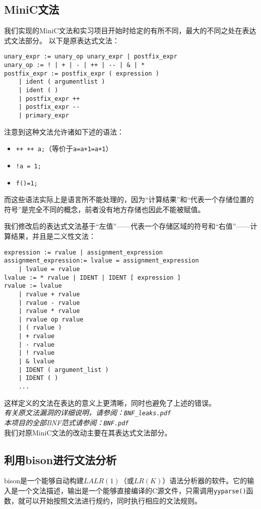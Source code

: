 \subsection{MiniC文法}
我们实现的MiniC文法和实习项目开始时给定的有所不同，最大的不同之处在表达式文法部分。
以下是原表达式文法：
\begin{verbatim}
unary_expr := unary_op unary_expr | postfix_expr
unary_op := ! | + | - | ++ | -- | & | *
postfix_expr := postfix_expr ( expression )
	| ident ( argumentlist )
	| ident ( )
	| postfix_expr ++
	| postfix_expr --
	| primary_expr
\end{verbatim}
注意到这种文法允许诸如下述的语法：
\begin{itemize}
	\item \verb|++ ++ a;|（等价于\verb|a=a+1=a+1|）
	\item \verb|!a = 1;|
	\item \verb|f()=1;|
\end{itemize}
而这些语法实际上是语言所不能处理的，因为“计算结果”和“代表一个存储位置的符号”是完全不同的概念，前者没有地方存储也因此不能被赋值。

我们修改后的表达式文法基于“左值”——代表一个存储区域的符号和“右值”——计算结果，并且是二义性文法：
\begin{verbatim}
expression := rvalue | assignment_expression
assignment_expression:= lvalue = assignment_expression 
	| lvalue = rvalue
lvalue := * rvalue | IDENT | IDENT [ expression ]
rvalue := lvalue
	| rvalue + rvalue
	| rvalue - rvalue
	| rvalue * rvalue
	| rvalue op rvalue
	| ( rvalue )
	| + rvalue
	| - rvalue
	| ! rvalue
	| & lvalue
	| IDENT ( argument_list )
	| IDENT ( )
	...
\end{verbatim}
这样定义的文法在表达的意义上更清晰，同时也避免了上述的错误。\\
{\it \anchor 有关原文法漏洞的详细说明，请参阅：\verb|BNF_leaks.pdf|}\\
{\it \anchor 本项目的全部BNF范式请参阅：\verb|BNF.pdf|}\\

我们对原MiniC文法的改动主要在其表达式文法部分。

\subsection{利用bison进行文法分析}
bison是一个能够自动构建$LALR(1)$（或$LR(K)$）语法分析器的软件。它的输入是一个文法描述，输出是一个能够直接编译的C源文件，只需调用\verb|yyparse()|函数，就可以开始按照文法进行规约，同时执行相应的文法规则。

